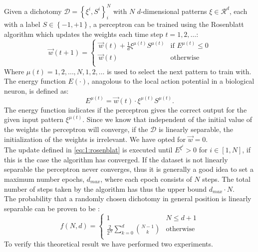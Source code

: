 Given a dichotomy $\mathcal{D} = \left\{\xi^i, S^i \right\}_{i}^{N}$ with $N$ $d$-dimensional patterns $\xi \in \mathcal{R}^d$, each with a label $S \in \left\{-1, +1 \right\}$, a perceptron can be trained using the Rosenblatt algorithm which updates the weights each time step $t = 1, 2, \ldots$:
	\begin{equation}\label{eq:1:rosenblat}
		\vec{w}(t+1) = 
		\begin{cases}
		\vec{w}(t) + \frac{1}{d} \xi^{\mu(t)} S^{\mu(t)}
		& \text{if } E^{\mu(t)} \leq 0\\
		\vec{w}(t) 											
		& \text{otherwise}\\
		\end{cases}
	\end{equation}
Where $\mu(t) = 1, 2, \ldots, N, 1, 2, \ldots$ is used to select the next pattern to train with. The energy function $E(\cdot)$, anagolous to the local action potential in a biological neuron, is defined as:
	\begin{equation}\label{eq:1:energyFunction}
		E^{\mu(t)} = \vec{w}(t) \cdot \xi^{\mu(t)}S^{\mu(t)}.
	\end{equation}
The energy function indicates if the perceptron gives the correct output for the given input pattern $\xi^{\mu(t)}$. Since we know that independent of the initial value of the weights the perceptron will converge, if the $\mathcal{D}$ is linearly separable, the initialization of the weights is irrelevant. We have opted for $\vec{w} = 0$.\\

The update defined in \autoref{eq:1:rosenblat} is executed until $E^{\xi^i} > 0$ for $i \in [1, N]$, if this is the case the algorithm has converged. If the dataset is not linearly separable the perceptron never converges, thus it is generally a good idea to set a maximum number epochs, $d_{max}$, where each epoch consists of $N$ steps. The total number of steps taken by the algorithm has thus the upper bound $d_{max} \cdot N$. \\

The probability that a randomly chosen dichotomy  in general position is linearly separable can be proven to be \cite{reed1998neural}:
	\begin{equation}\label{eq:1:lsChance}
		f(N,d) = 
		\begin{cases}
		1
		& N \leq d + 1\\
		\frac{2}{2^N} \sum_{k = 0}^{d} \binom{N - 1}{k}										
		& \text{otherwise}\\
		\end{cases}
	\end{equation}
To verify this theoretical result we have performed two experiments.


